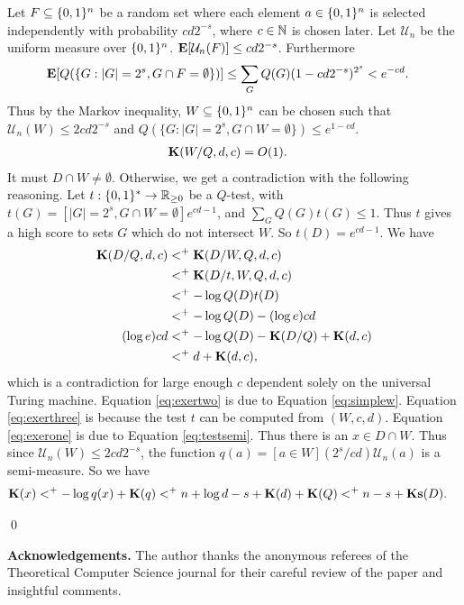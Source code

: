 \documentclass[11pt]{article}\textwidth 6.5in\textheight 9in
\begin{document}
\begin{prf}
Let $F\subseteq\{0,1\}^n$ be a random set where each element $a\in\{0,1\}^n$ is selected independently with probability $cd2^{-s}$, where $c\in\mathbb{N}$ is chosen later. Let $\mathcal{U}_n$ be the uniform measure over $\{0,1\}^n$. ${\mathbf E}[\mathcal{U}_n(F)]\leq cd2^{-s}$. Furthermore 
\begin{align*}
&{\mathbf E}[Q(\{G:|G|=2^s,G\cap F=\emptyset\})]\leq \sum_GQ(G)(1-cd2^{-s})^{2^s}< e^{-cd}.
\end{align*}
Thus by the Markov inequality, $W\subseteq\{0,1\}^n$ can be chosen such that $\mathcal{U}_n(W)\leq 2cd2^{-s}$ and $Q(\{G:|G|=2^s,G\cap W=\emptyset\}) \leq e^{1-cd}$. 
\begin{align}
\label{eq:simplew}
{\mathbf K}(W/Q,d,c)&=O(1).
\end{align} 
It must $D\cap W\neq \emptyset$. Otherwise, we get a contradiction with the following reasoning. Let $t:\{0,1\}^*\rightarrow\mathbb{R}_{\geq 0}$ be a $Q$-test, with $t(G)=[|G|=2^s, G\cap W=\emptyset]e^{cd-1}$, and $\sum_GQ(G)t(G)\leq 1$. Thus $t$ gives a high score to sets $G$ which do not intersect $W$. So $t(D)=e^{cd-1}$. We have
\begin{align}
\label{eq:exertwo}
{\mathbf K}(D/Q,d,c) &<^+ {\mathbf K}(D/W,Q,d,c)\\
\label{eq:exerthree}
&<^+ {\mathbf K}(D/t,W,Q,d,c)\\
\label{eq:exerone}
 &<^+ -\log Q(D)t(D)\\
\nonumber
 &<^+ -\log Q(D)-(\log e)cd\\
 \nonumber
(\log e)cd & <^+ -\log Q(D)-{\mathbf K}(D/Q) + {\mathbf K}(d,c)\\
\nonumber
& <^+ d + {\mathbf K}(d,c),
\end{align}
 which is a contradiction for large enough $c$ dependent solely on the universal Turing machine.  Equation \ref{eq:exertwo} is due to Equation \ref{eq:simplew}. Equation \ref{eq:exerthree} is because the test $t$ can be computed from $(W,c,d)$. Equation \ref{eq:exerone} is due to Equation \ref{eq:testsemi}. Thus there is an $x\in D\cap W$. Thus since $\mathcal{U}_n(W)\leq 2cd2^{-s}$, the function $q(a) = [a\in W](2^s/cd)\mathcal{U}_n(a)$ is a semi-measure. So we have 
\begin{align*}
{\mathbf K}(x) &<^+ -\log q(x) + {\mathbf K}(q)<^+ n +\log d -s +{\mathbf K}(d)+{\mathbf K}(Q)<^+  n  -s +\mathbf{Ks}(D).
\end{align*}

 \qed
\end{prf}


\noindent\textbf{Acknowledgements.} The author thanks the anonymous referees of the Theoretical Computer Science journal for their careful review of the paper and insightful comments.

 

\end{document}
